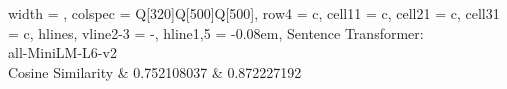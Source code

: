 \documentclass{article}
\begin{document}
\begin{table}
\begin{tblr}{
  width = \linewidth,
  colspec = {Q[320]Q[500]Q[500]},
  row{4} = {c},
  cell{1}{1} = {c},
  cell{2}{1} = {c},
  cell{3}{1} = {c},
  hlines,
  vline{2-3} = {-}{},
  hline{1,5} = {-}{0.08em},
}
{Sentence Transformer:\\all-MiniLM-L6-v2\\Cosine Similarity} & 0.752108037                                                                                                                                                                                                                                                                                                                                                                                                                                                                 & 0.872227192                                                                                                                                                                                                                                                                                                                                                                                                                                  
\end{tblr}
\end{table}
\end{document}

